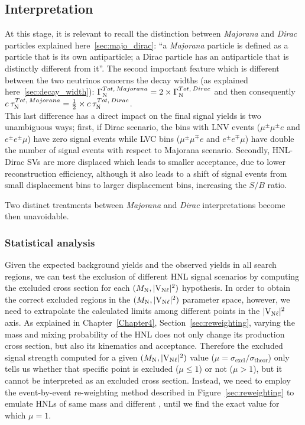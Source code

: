 \vspace{10cm}



\subsection{Interpretation}
At this stage, it is relevant to recall the distinction between
\emph{Majorana} and \emph{Dirac} particles explained
here~\ref{sec:majo_dirac}: ``a \emph{Majorana} particle is defined as
a particle that is its own antiparticle; a Dirac particle has an
antiparticle that is distinctly different from it''.
The second important feature which is different between the two
neutrinos concerns the decay widths (as explained
here~\ref{sec:decay_width}): $\Gamma^{Tot, \: Majorana}_{\mathrm{N}} = 2 \times \Gamma^{Tot, \: Dirac}_{\mathrm{N}}
$ and then consequently $c\:\tau^{Tot, \: Majorana}_{\mathrm{N}} = \frac{1}{2} \times c\:\tau^{Tot, \: Dirac}_{\mathrm{N}}
$.\\
This last difference has a direct impact on the final signal yields is
two unambiguous ways; first, if Dirac scenario, the bins with LNV events ($\mu^{\pm}\mu^{\pm} e$ and $e^{\pm}e^{\pm}\mu$)
have zero signal events while LVC bins
($\mu^{\pm}\mu^{\mp} e$ and $e^{\pm}e^{\mp}\mu$) have double the
number of signal events with respect to Majorana scenario. Secondly, HNL-Dirac SVs
are more displaced which leads to smaller acceptance, due to lower
reconstruction efficiency, although it also leads to a shift of signal
events from small displacement bins to larger displacement bins,
increasing the $S/B$ ratio.

Two distinct treatments between
\emph{Majorana} and \emph{Dirac} interpretations become then
unavoidable. 
\subsubsection{Statistical analysis}
Given the expected background yields and the observed yields in all
search regions, we can test the exclusion of different HNL signal 
scenarios by computing the excluded cross section
for each $(M_{\mathrm{N}},\mathrm{|V_{\mathrm{N}\ell}|^2})$ hypothesis.
In order to obtain the correct excluded regions in the
$(M_{\mathrm{N}},\mathrm{|V_{\mathrm{N}\ell}|^2})$ parameter space, however, we need to extrapolate the
calculated limits among different points in the
$\mathrm{|V_{\mathrm{N}\ell}|^2}$ axis.
As explained in Chapter~\ref{Chapter4}, Section~\ref{sec:reweighting}, varying the mass and mixing
probability of the HNL does not only change its production cross
section, but also its kinematics and acceptance.
Therefore the excluded signal strength computed for a given
$(M_{\mathrm{N}},\mathrm{|V_{\mathrm{N}\ell}|^2})$ value
($\mu=\sigma_{\mathrm{excl}}/\sigma_{\mathrm{theor}}$) only tells us
whether that specific point is excluded ($\mu\leq 1$) or not
($\mu>1$), but it cannot be interpreted as an excluded cross section.
Instead, we need to employ the event-by-event re-weighting method
described in Figure~\ref{sec:reweighting} to emulate HNLs of same mass and
different \mixpar, until we find the exact \mixpar value for which
$\mu=1$.\\

